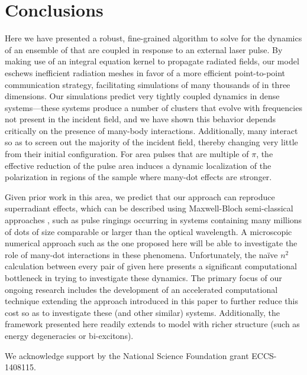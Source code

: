 \section{Conclusions}
Here we have presented a robust, fine-grained algorithm to solve for the dynamics of an ensemble of \qds{} that are coupled in response to an external laser pulse. 
By making use of an integral equation kernel to propagate radiated fields, our model eschews inefficient radiation meshes in favor of a more efficient point-to-point communication strategy, facilitating simulations of many thousands of \qds{} in three dimensions.
Our simulations predict very tightly coupled dynamics in dense \qd{} systems---these systems produce a number of clusters that evolve with frequencies not present in the incident field, and we have shown this behavior depends critically on the presence of many-body interactions.
Additionally, many \qds{} interact so as to screen out the majority of the incident field, thereby changing very little from their initial configuration. For area pulses that are multiple of $\pi$, the effective reduction of the pulse area induces a dynamic localization of the polarization in regions of the sample where many-dot effects are stronger. 

Given prior work in this area, we predict that our approach can reproduce superradiant effects, which can be  described using Maxwell-Bloch semi-classical approaches \cite{haroche review}, such as pulse ringings \cite{Burnham-Chiao PR 188 667 1969,MacGillivray1976} occurring in systems containing many millions of dots of size comparable or larger than the optical wavelength. A  microscopic numerical approach such as the one proposed here will be able to investigate the role of many-dot interactions in these phenomena. Unfortunately, the na\"ive $n^2$ calculation between every pair of \qds{} given here presents a significant computational bottleneck in trying to investigate these dynamics. The primary focus of our ongoing research includes the development of an accelerated computational technique extending the approach introduced in this paper to further reduce this cost so as to investigate these (and other similar) systems. Additionally, the framework presented here readily extends to model \qds{} with richer structure (such as energy degeneracies or bi-excitons).

\acknowledgments  We acknowledge support by the National Science Foundation grant ECCS-1408115. 
